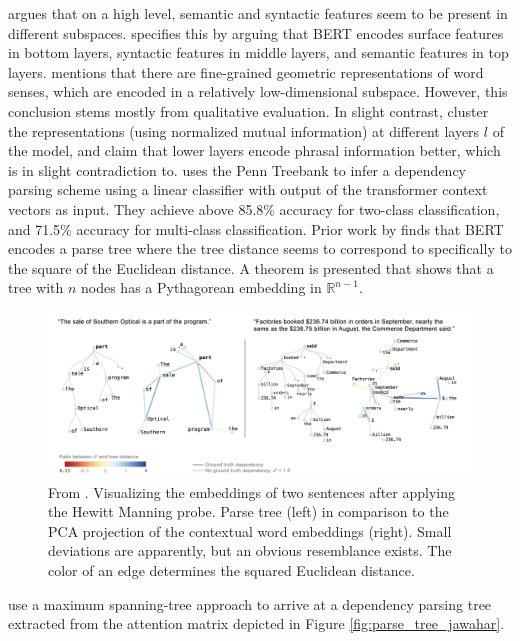 \documentclass[a4paper,12pt,oneside,openright]{report}
\begin{document}
\cite{coenen19} argues that on a high level, semantic and syntactic features seem to be present in different subspaces.
\cite{jawahar19} specifies this by arguing that BERT encodes surface features in bottom layers, syntactic features in middle layers, and semantic features in top layers.
\cite{coenen19} mentions that there are fine-grained geometric representations of word senses, which are encoded in a relatively low-dimensional subspace.
However, this conclusion stems mostly from qualitative evaluation.
In slight contrast, \cite{jawahar19} cluster the representations (using normalized mutual information) at different layers $l$ of the model, and claim that lower layers encode phrasal information better, which is in slight contradiction to.
\cite{coenen19} uses the Penn Treebank \cite{marcus93} to infer a dependency parsing scheme using a linear classifier with output of the transformer context vectors as input.
They achieve above 85.8\% accuracy for two-class classification, and 71.5\% accuracy for multi-class classification.
Prior work by \cite{hewitt19} finds that BERT encodes a parse tree where the tree distance seems to correspond to specifically to the square of the Euclidean distance.
A theorem is presented that shows that a tree with $n$ nodes has a Pythagorean embedding in $\mathbb{R}^{n-1}$.

\begin{figure}
	\center
  \includegraphics[width=\linewidth]{./assets/relatedwork/BERT_tree.png}
  \caption{From \cite{coenen19}. Visualizing the embeddings of two sentences after applying the Hewitt Manning probe. Parse tree (left) in comparison to the PCA projection of the contextual word embeddings (right). Small deviations are apparently, but an obvious resemblance exists. The color of an edge determines the squared Euclidean distance.}
  \label{fig:BERT_tree}
\end{figure}

\cite{jawahar19}  use a maximum spanning-tree approach to arrive at a dependency parsing tree extracted from the attention matrix depicted in Figure \ref{fig:parse_tree_jawahar}.\\
\end{document}

